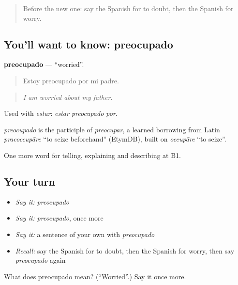 \label{lesson:ES-C719-preocupado}



\begin{quote}
Before the new one: say the Spanish for to doubt, then the Spanish for worry.
\end{quote}

\subsection*{You'll want to know: preocupado}
\textbf{preocupado} — \textquotedblleft{}worried\textquotedblright{}.

\begin{quote}
Estoy preocupado por mi padre.
\end{quote}

\begin{quote}
\emph{I am worried about my father.}
\end{quote}

Used with \emph{estar}: \emph{estar preocupado por}.

\begin{cousinweb}
\emph{preocupado} is the participle of \emph{preocupar}, a learned borrowing from Latin \emph{praeoccupāre} \textquotedblleft{}to seize beforehand\textquotedblright{} (EtymDB), built on \emph{occupāre} \textquotedblleft{}to seize\textquotedblright{}.
\end{cousinweb}

\begin{grammarlens}[title={What you've built}]
One more word for telling, explaining and describing at B1.
\end{grammarlens}

\subsection*{Your turn}
\begin{itemize}
\raggedright
  \item \emph{Say it:} \emph{preocupado}
  \item \emph{Say it:} \emph{preocupado}, once more
  \item \emph{Say it:} a sentence of your own with \emph{preocupado}
  \item \emph{Recall:} say the Spanish for to doubt, then the Spanish for worry, then say \emph{preocupado} again
\end{itemize}

\begin{tcolorbox}[breakable,colback=teal!4,colframe=teal!35!black,title={Before you move on}]
What does preocupado mean? (\textquotedblleft{}Worried\textquotedblright{}.) Say it once more.
\end{tcolorbox}
